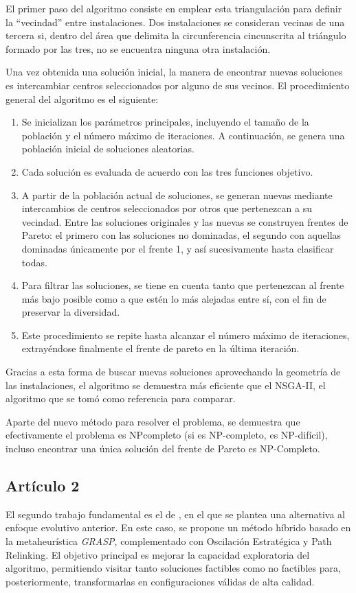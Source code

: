 \documentclass[12pt,a4paper]{book}
\begin{document}
El primer paso del algoritmo consiste en emplear esta triangulación para definir la ``vecindad'' entre instalaciones. Dos instalaciones se consideran vecinas de una tercera si, 
dentro del área que delimita la circunferencia cincunscrita al triángulo formado por las tres, no se encuentra ninguna otra instalación. 

Una vez obtenida una solución inicial, la manera de encontrar nuevas soluciones es intercambiar centros seleccionados por alguno de sus vecinos. El procedimiento general del algoritmo es el siguiente:

\begin{enumerate}
    \item Se inicializan los parámetros principales, incluyendo el tamaño de la población y el número máximo de iteraciones. A continuación, se genera una población inicial de soluciones aleatorias.
    \item Cada solución es evaluada de acuerdo con las tres funciones objetivo.
    \item A partir de la población actual de soluciones, se generan nuevas mediante intercambios de centros seleccionados por otros que pertenezcan a su vecindad. Entre las soluciones originales y las nuevas se construyen frentes
    de Pareto: el primero con las soluciones no dominadas, el segundo con aquellas dominadas únicamente por el frente 1, y así sucesivamente hasta clasificar todas. 
    \item Para filtrar las soluciones, se tiene en cuenta tanto que pertenezcan al frente más bajo posible como a que estén lo más alejadas entre sí, con el fin de preservar la diversidad. 
    \item Este procedimiento se repite hasta alcanzar el número máximo de iteraciones,  extrayéndose finalmente el frente de pareto en la última iteración.
\end{enumerate}
Gracias a esta forma de buscar nuevas soluciones aprovechando la geometría de las instalaciones, el algoritmo se demuestra más eficiente que el NSGA-II, el algoritmo que se tomó 
como referencia para comparar. 

Aparte del nuevo método para resolver el problema, se demuestra que efectivamente el problema es NP\-completo (si es NP-completo, es NP-difícil), incluso encontrar una única
solución del frente de Pareto es NP-Completo.

\subsection{Artículo 2}
El segundo trabajo fundamental es el de \cite{k-Balanced_2}, en el que se plantea una alternativa al enfoque evolutivo anterior. En este caso, se propone un método híbrido basado en la metaheurística \textit{GRASP}, complementado con Oscilación Estratégica y Path Relinking. El objetivo principal es mejorar la capacidad exploratoria del algoritmo, permitiendo visitar tanto soluciones factibles como no factibles para, posteriormente, transformarlas en configuraciones válidas de alta calidad.
\end{document}
